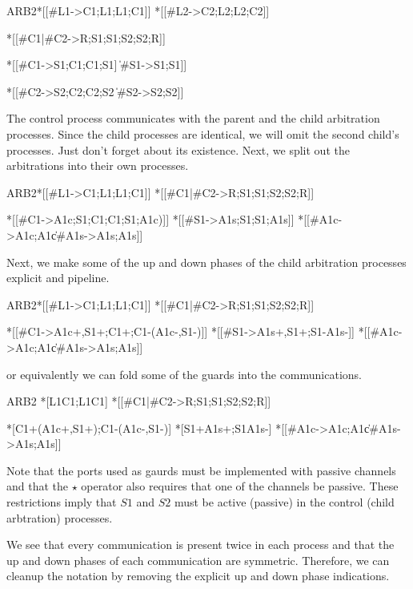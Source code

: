 \documentclass[aer.tex]{subfiles}
\begin{document}
\begin{csp}
ARB2\equiv*
  *[[#{L1}->C1;L1;L1;C1]] \pll
  *[[#{L2}->C2;L2;L2;C2]] \pll

  *[[#{C1}|#{C2}->R;S1;S1;S2;S2;R]] \pll

  *[[#{C1}->S1;C1;C1;S1]
    \|#{S1}->S1;S1]] \pll
  
  *[[#{C2}->S2;C2;C2;S2
    \|#{S2}->S2;S2]] \pll
\end{csp}

The control process communicates with the parent and the child arbitration processes.
Since the child processes are identical, we will omit the second child's processes.
Just don't forget about its existence.
Next, we split out the arbitrations into their own processes. 

\begin{csp}
ARB2\equiv*
  *[[#{L1}->C1;L1;L1;C1]] \pll
  *[[#{C1}|#{C2}->R;S1;S1;S2;S2;R]] \pll

  *[[#{C1}->A1c;S1;C1;C1;S1;A1c)]] \pll
  *[[#{S1}->A1s;S1;S1;A1s]] \pll
  *[[#{A1c}->A1c;A1c\|#{A1s}->A1s;A1s]] \pll
\end{csp}

\noindent Next, we make some of the up and down phases of the child arbitration processes explicit and pipeline.

\begin{csp}
ARB2\equiv*
  *[[#{L1}->C1;L1;L1;C1]] \pll
  *[[#{C1}|#{C2}->R;S1;S1;S2;S2;R]] \pll

  *[[#{C1}->A1c+,S1+;C1+;C1-\star(A1c-,S1-)]] \pll
  *[[#{S1}->A1s+,S1+;S1-\star\!A1s-]] \pll
  *[[#{A1c}->A1c;A1c\|#{A1s}->A1s;A1s]] \pll
\end{csp}

\noindent or equivalently we can fold some of the guards into the communications.

\begin{csp}
ARB2\equiv
  *[L1\star\!C1;L1\star\!C1] \pll
  *[[#{C1}|#{C2}->R;S1;S1;S2;S2;R]] \pll

  *[C1+\star(A1c+,S1+);C1-\star(A1c-,S1-)] \pll
  *[S1+\star\!A1s+;S1\star\!A1s-] \pll
  *[[#{A1c}->A1c;A1c\|#{A1s}->A1s;A1s]] \pll
\end{csp}

Note that the ports used as gaurds must be implemented with passive channels and that
the $\star$ operator also requires that one of the channels be passive. 
These restrictions imply that $S1$ and $S2$ must be active (passive) in the control (child arbtration) processes.

We see that every communication is present twice in each process
and that the up and down phases of each communication are symmetric. 
Therefore, we can cleanup the notation by removing the explicit up and down phase indications.
\end{document}
